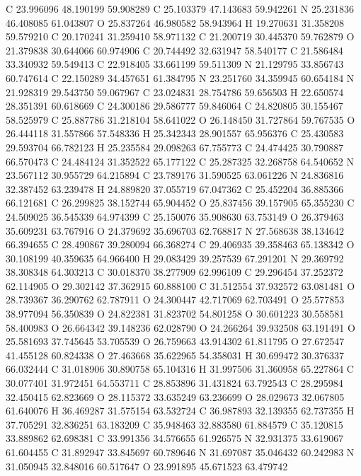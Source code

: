 \documentclass{article}
\begin{document}
C 23.996096 48.190199 59.908289 
C 25.103379 47.143683 59.942261 
N 25.231836 46.408085 61.043807 
O 25.837264 46.980582 58.943964 
H 19.270631 31.358208 59.579210 
C 20.170241 31.259410 58.971132 
C 21.200719 30.445370 59.762879 
O 21.379838 30.644066 60.974906 
C 20.744492 32.631947 58.540177 
C 21.586484 33.340932 59.549413 
C 22.918405 33.661199 59.511309 
N 21.129795 33.856743 60.747614 
C 22.150289 34.457651 61.384795 
N 23.251760 34.359945 60.654184 
N 21.928319 29.543750 59.067967 
C 23.024831 28.754786 59.656503 
H 22.650574 28.351391 60.618669 
C 24.300186 29.586777 59.846064 
C 24.820805 30.155467 58.525979 
C 25.887786 31.218104 58.641022 
O 26.148450 31.727864 59.767535 
O 26.444118 31.557866 57.548336 
H 25.342343 28.901557 65.956376 
C 25.430583 29.593704 66.782123 
H 25.235584 29.098263 67.755773 
C 24.474425 30.790887 66.570473 
C 24.484124 31.352522 65.177122 
C 25.287325 32.268758 64.540652 
N 23.567112 30.955729 64.215894 
C 23.789176 31.590525 63.061226 
N 24.836816 32.387452 63.239478 
H 24.889820 37.055719 67.047362 
C 25.452204 36.885366 66.121681 
C 26.299825 38.152744 65.904452 
O 25.837456 39.157905 65.355230 
C 24.509025 36.545339 64.974399 
C 25.150076 35.908630 63.753149 
O 26.379463 35.609231 63.767916 
O 24.379692 35.696703 62.768817 
N 27.568638 38.134642 66.394655 
C 28.490867 39.280094 66.368274 
C 29.406935 39.358463 65.138342 
O 30.108199 40.359635 64.966400 
H 29.083429 39.257539 67.291201 
N 29.369792 38.308348 64.303213 
C 30.018370 38.277909 62.996109 
C 29.296454 37.252372 62.114905 
O 29.302142 37.362915 60.888100 
C 31.512554 37.932572 63.081481 
O 28.739367 36.290762 62.787911 
O 24.300447 42.717069 62.703491 
O 25.577853 38.977094 56.350839 
O 24.822381 31.823702 54.801258 
O 30.601223 30.558581 58.400983 
O 26.664342 39.148236 62.028790 
O 24.266264 39.932508 63.191491 
O 25.581693 37.745645 53.705539 
O 26.759663 43.914302 61.811795 
O 27.672547 41.455128 60.824338 
O 27.463668 35.622965 54.358031 
H 30.699472 30.376337 66.032444 
C 31.018906 30.890758 65.104316 
H 31.997506 31.360958 65.227864 
C 30.077401 31.972451 64.553711 
C 28.853896 31.431824 63.792543 
C 28.295984 32.450415 62.823669 
O 28.115372 33.635249 63.236699 
O 28.029673 32.067805 61.640076 
H 36.469287 31.575154 63.532724 
C 36.987893 32.139355 62.737355 
H 37.705291 32.836251 63.183209 
C 35.948463 32.883580 61.884579 
C 35.120815 33.889862 62.698381 
C 33.991356 34.576655 61.926575 
N 32.931375 33.619067 61.604455 
C 31.892947 33.845697 60.789646 
N 31.697087 35.046432 60.242983 
N 31.050945 32.848016 60.517647 
O 23.991895 45.671523 63.479742 
\end{document}
